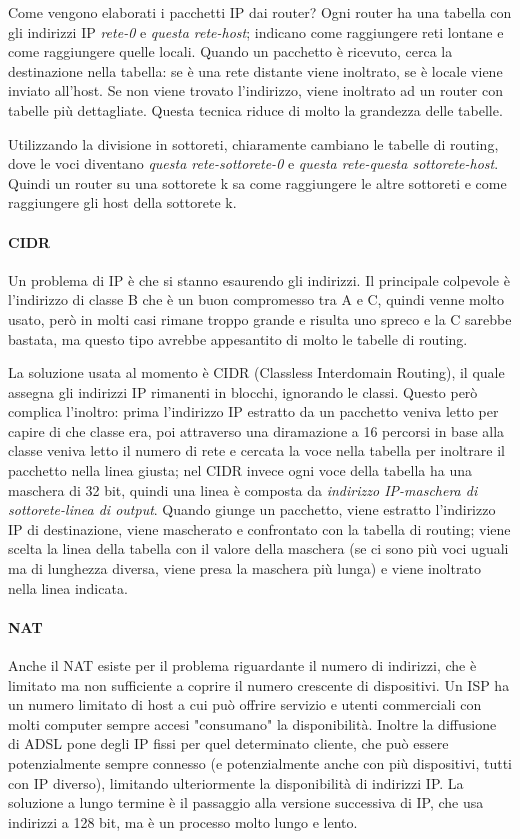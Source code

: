 Come vengono elaborati i pacchetti IP dai router? 
Ogni router ha una tabella con gli indirizzi IP \textit{rete-0} e \textit{questa rete-host};
indicano come raggiungere reti lontane e come raggiungere quelle locali.
Quando un pacchetto è ricevuto, cerca la destinazione nella tabella: 
se è una rete distante viene inoltrato, se è locale viene inviato all'host.
Se non viene trovato l'indirizzo, viene inoltrato ad un router con tabelle più dettagliate.
Questa tecnica riduce di molto la grandezza delle tabelle.

Utilizzando la divisione in sottoreti, chiaramente cambiano le tabelle di routing, dove le voci diventano
\textit{questa rete-sottorete-0} e \textit{questa rete-questa sottorete-host}.
Quindi un router su una sottorete k sa come raggiungere le altre sottoreti e come raggiungere gli host della sottorete k.

\paragraph{CIDR}
Un problema di IP è che si stanno esaurendo gli indirizzi.
Il principale colpevole è l'indirizzo di classe B che è un buon compromesso tra A e C, quindi venne molto usato, però in molti casi rimane troppo grande e risulta uno spreco e la C sarebbe bastata, ma questo tipo avrebbe appesantito di molto le tabelle di routing.

La soluzione usata al momento è CIDR (Classless Interdomain Routing), il quale assegna gli indirizzi IP rimanenti in blocchi, ignorando le classi.
Questo però complica l'inoltro:
prima l'indirizzo IP estratto da un pacchetto veniva letto per capire di che classe era, poi attraverso una diramazione a 16 percorsi in base alla classe veniva letto il numero di rete e cercata la voce nella tabella per inoltrare il pacchetto nella linea giusta;
nel CIDR invece ogni voce della tabella ha una maschera di 32 bit, quindi una linea è composta da \textit{indirizzo IP-maschera di sottorete-linea di output}.
Quando giunge un pacchetto, viene estratto l'indirizzo IP di destinazione, viene mascherato e confrontato con la tabella di routing;
viene scelta la linea della tabella con il valore della maschera (se ci sono più voci uguali ma di lunghezza diversa, viene presa la maschera più lunga) e viene inoltrato nella linea indicata.

\paragraph{NAT}
Anche il NAT esiste per il problema riguardante il numero di indirizzi, che è limitato ma non sufficiente a coprire il numero crescente di dispositivi.
Un ISP ha un numero limitato di host a cui può offrire servizio e utenti commerciali con molti computer sempre accesi "consumano" la disponibilità.
Inoltre la diffusione di ADSL pone degli IP fissi per quel determinato cliente, che può essere potenzialmente sempre connesso (e potenzialmente anche con più dispositivi, tutti con IP diverso), limitando ulteriormente la disponibilità di indirizzi IP.
La soluzione a lungo termine è il passaggio alla versione successiva di IP, che usa indirizzi a 128 bit, ma è un processo molto lungo e lento.

